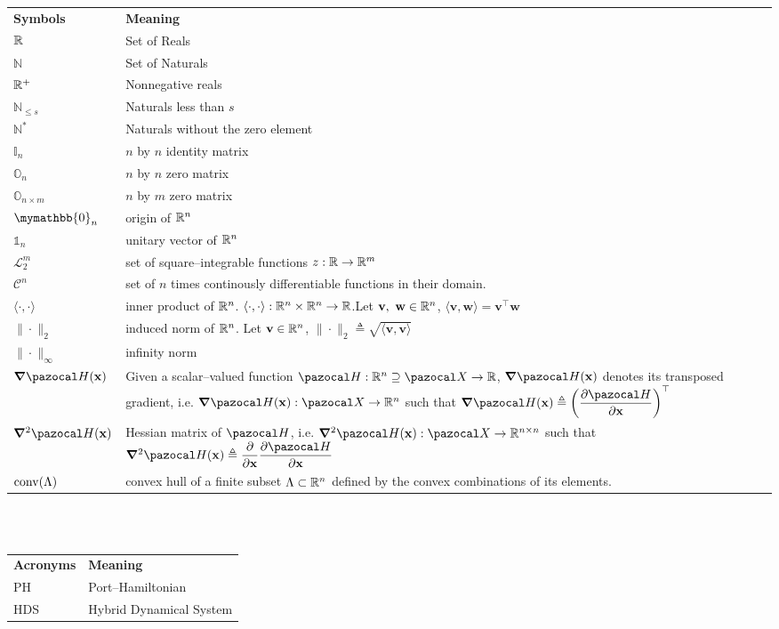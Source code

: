 \mbox{}\\
\mbox{}\\
\begin{tabularx}{0.95\textwidth}{p{2.75cm} X}
\textbf{Symbols} 			& \textbf{Meaning}\\
 $\mathbb{R}$                       & Set of Reals\\
 $\mathbb{N}$               & Set of Naturals\\
 $\mathbb{R}^+$                     & Nonnegative reals\\
 $\mathbb{N}_{\leq s}$      & Naturals less than $s$\\
 $\mathbb{N}^*$             & Naturals without the zero element\\
 $\mathbb{I}_n$             & $n$ by $n$ identity matrix\\
 $\mathbb{O}_n$             & $n$ by $n$ zero matrix\\
 $\mathbb{O}_{n\times m}$   & $n$ by $m$ zero matrix\\
 $\mymathbb{0}_n$           & origin of $\mathbb{R}^n$\\
 $\mathbb{1}_n$             & unitary vector of $\mathbb{R}^n$\\
 $\mathcal{L}_2^m$                  & set of square--integrable functions $z:\mathbb{R}\rightarrow\mathbb{R}^m$\\
  $\mathcal{C}^n$                  & set of $n$ times continously differentiable functions in their domain.\\
 $\langle \cdot,\cdot\rangle$ & {inner product of $\mathbb{R}^n$. $\langle \cdot,\cdot\rangle:\mathbb{R}^n\times\mathbb{R}^n\rightarrow\mathbb{R}$.\newline Let $\mathbf{v},~\mathbf{w}\in\mathbb{R}^n$, $\langle \mathbf{v},\mathbf{w}\rangle = \mathbf{v}^\top \mathbf{w}$} \\
 $\|\cdot\|_2$              & induced norm of $\mathbb{R}^n$. Let $\mathbf{v}\in\mathbb{R}^n$, $\|\cdot\|_2\triangleq\sqrt{\langle \mathbf{v},\mathbf{v}\rangle}$ \\
 $\|\cdot\|_\infty$         & infinity norm\\
 $\bm\nabla\Ha(\xb)$        & Given a scalar--valued function $\Ha:\R^n\supseteq\X\rightarrow\R$, $\bm\nabla\Ha(\xb)$ denotes its transposed gradient, i.e. $\bm\nabla\Ha(\xb):\X\rightarrow\R^n$ such that $\bm\nabla\Ha(\xb)\triangleq\left(\dfrac{\partial \Ha}{\partial\xb}\right)^\top$\\
 $\bm\nabla^2\Ha(\xb)$      & Hessian matrix of $\Ha$, i.e. $\bm\nabla^2\Ha(\xb):\X\rightarrow\R^{n\times n}$ such that $\bm\nabla^2\Ha(\xb)\triangleq\dfrac{\partial}{\partial\xb}\dfrac{\partial\Ha}{\partial\x}$\\
 $\operatorname{conv}(\Lambda)$           & convex hull of a finite subset $\Lambda\subset\mathbb{R}^n$ defined by the convex combinations of its elements. 
\end{tabularx}

\mbox{}\\
\mbox{}\\
\begin{tabularx}{0.95\textwidth}{p{2.75cm} X}
 \textbf{Acronyms} 			& \textbf{Meaning}\\
PH				    & Port--Hamiltonian\\
HDS					& Hybrid Dynamical System\\
\end{tabularx}
